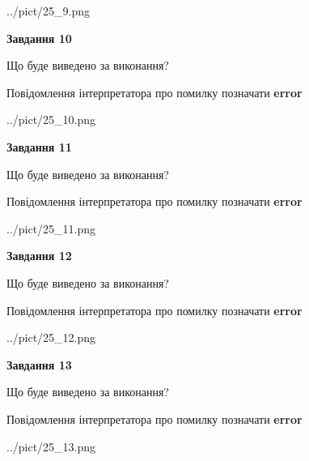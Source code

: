 \documentclass[11pt, ukrainian]{article}
\begin{document}
{\begin {large}
\begin{center}
	{../pict/25_9.png}
\end{center}
\newpage

{\begin {center}\textbf{Завдання 10}\end {center}}\par
Що буде виведено за виконання? \par
Повідомлення інтерпретатора про помилку позначати \textbf{error}

\begin{center}
	{../pict/25_10.png}
\end{center}
\newpage

{\begin {center}\textbf{Завдання 11}\end {center}}\par
Що буде виведено за виконання? \par
Повідомлення інтерпретатора про помилку позначати \textbf{error}

\begin{center}
	{../pict/25_11.png}
\end{center}
\newpage

{\begin {center}\textbf{Завдання 12}\end {center}}\par
Що буде виведено за виконання? \par
Повідомлення інтерпретатора про помилку позначати \textbf{error}

\begin{center}
	{../pict/25_12.png}
\end{center}
\newpage

{\begin {center}\textbf{Завдання 13}\end {center}}\par
Що буде виведено за виконання? \par
Повідомлення інтерпретатора про помилку позначати \textbf{error}

\begin{center}
	{../pict/25_13.png}
\end{center}
\newpage


\end{large}}
\end{document}
